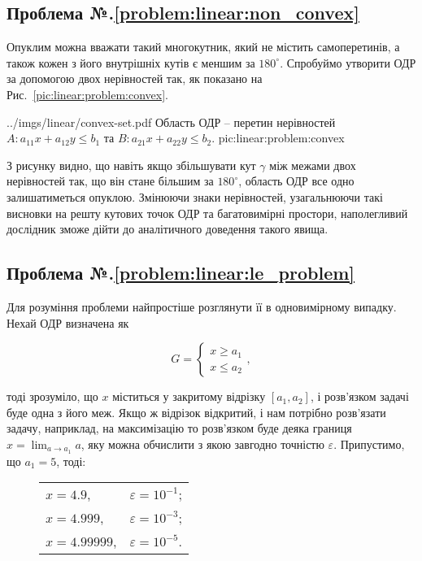 \documentclass[\main/book.tex]{subfiles}
\begin{document}
\subsection*{Проблема №.\ref{problem:linear:non_convex}}

Опуклим можна вважати такий многокутник, який не містить самоперетинів, а також кожен з його внутрішніх кутів є меншим за $180^\circ$. Спробуймо утворити ОДР за допомогою двох нерівностей так, як показано на Рис.~\ref{pic:linear:problem:convex}.

\illustration
 {../imgs/linear/convex-set.pdf}
 {Область ОДР -- перетин нерівностей ${A: a_{11} x + a_{12} y \leq b_1}$ та ${B: a_{21} x + a_{22} y \leq b_2}$.}
 {pic:linear:problem:convex}

З рисунку видно, що навіть якщо збільшувати кут $\gamma$ між межами двох нерівностей так, що він стане більшим за $180^\circ$, область ОДР все одно залишатиметься опуклою. Змінюючи знаки нерівностей, узагальнюючи такі висновки на решту кутових точок ОДР та багатовимірні простори, наполегливий дослідник зможе дійти до аналітичного доведення такого явища.

\subsection*{Проблема №.\ref{problem:linear:le_problem}}

Для розуміння проблеми найпростіше розглянути її в одновимірному випадку. Нехай ОДР визначена як

\[
 G = \left\{
  \begin{array}{l}
   x \geq a_1 \\
   x \leq a_2
  \end{array}
 \right.,
\]

тоді зрозуміло, що $x$ міститься у закритому відрізку $[a_1, a_2]$, і розв'язком задачі буде одна з його меж. Якщо ж відрізок відкритий, і нам потрібно розв'язати задачу, наприклад, на максимізацію то розв'язком буде деяка границя $x = \displaystyle \lim_{a \to a_1} a$, яку можна обчислити з якою завгодно точністю $\varepsilon$. Припустимо, що $a_1 = 5$, тоді:

\begin{figure}[!h]
 \center
 \begin{tabular}{ll}
  $x = 4.9$,     & $\varepsilon = 10^{-1}$; \\
  $x = 4.999$,   & $\varepsilon = 10^{-3}$; \\
  $x = 4.99999$, & $\varepsilon = 10^{-5}$.
 \end{tabular}
\end{figure}
\end{document}
